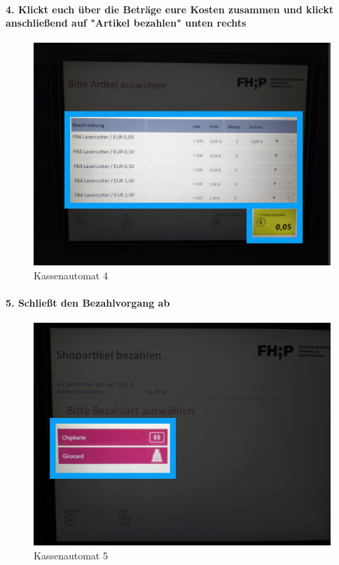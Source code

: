 \documentclass[]{article}
\let\oldparagraph\paragraph
\renewcommand{\paragraph}[1]{\oldparagraph{#1}\mbox{}}
\begin{document}
\hypertarget{klickt-euch-uxfcber-die-betruxe4ge-eure-kosten-zusammen-und-klickt-anschlieuxdfend-auf-artikel-bezahlen-unten-rechts}{%
\paragraph{4. Klickt euch über die Beträge eure Kosten zusammen und
klickt anschließend auf "Artikel bezahlen" unten
rechts}\label{klickt-euch-uxfcber-die-betruxe4ge-eure-kosten-zusammen-und-klickt-anschlieuxdfend-auf-artikel-bezahlen-unten-rechts}}

\begin{figure}
\hypertarget{fig:payment-4}{%
\centering
\includegraphics{assets/images/payment-4.png}
\caption{Kassenautomat 4}\label{fig:payment-4}
}
\end{figure}

\hypertarget{schlieuxdft-den-bezahlvorgang-ab}{%
\paragraph{5. Schließt den Bezahlvorgang
ab}\label{schlieuxdft-den-bezahlvorgang-ab}}

\begin{figure}
\hypertarget{fig:payment-5}{%
\centering
\includegraphics{assets/images/payment-5.png}
\caption{Kassenautomat 5}\label{fig:payment-5}
}
\end{figure}
\end{document}
